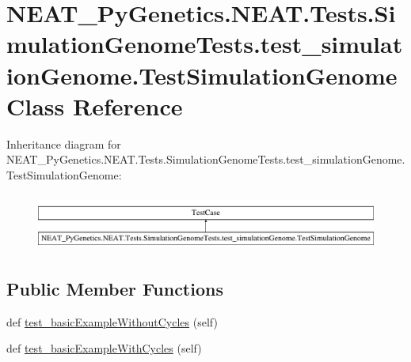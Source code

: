 \hypertarget{classNEAT__PyGenetics_1_1NEAT_1_1Tests_1_1SimulationGenomeTests_1_1test__simulationGenome_1_1TestSimulationGenome}{}\section{N\+E\+A\+T\+\_\+\+Py\+Genetics.\+N\+E\+A\+T.\+Tests.\+Simulation\+Genome\+Tests.\+test\+\_\+simulation\+Genome.\+Test\+Simulation\+Genome Class Reference}
\label{classNEAT__PyGenetics_1_1NEAT_1_1Tests_1_1SimulationGenomeTests_1_1test__simulationGenome_1_1TestSimulationGenome}
Inheritance diagram for N\+E\+A\+T\+\_\+\+Py\+Genetics.\+N\+E\+A\+T.\+Tests.\+Simulation\+Genome\+Tests.\+test\+\_\+simulation\+Genome.\+Test\+Simulation\+Genome\+:\begin{figure}[H]
\begin{center}
\leavevmode
\includegraphics[height=1.895093cm]{classNEAT__PyGenetics_1_1NEAT_1_1Tests_1_1SimulationGenomeTests_1_1test__simulationGenome_1_1TestSimulationGenome}
\end{center}
\end{figure}
\subsection*{Public Member Functions}
\begin{DoxyCompactItemize}
\item 
def \hyperlink{classNEAT__PyGenetics_1_1NEAT_1_1Tests_1_1SimulationGenomeTests_1_1test__simulationGenome_1_1TestSimulationGenome_a184a01fe3c6ad018183362dba9be2fa1}{test\+\_\+basic\+Example\+Without\+Cycles} (self)
\item 
def \hyperlink{classNEAT__PyGenetics_1_1NEAT_1_1Tests_1_1SimulationGenomeTests_1_1test__simulationGenome_1_1TestSimulationGenome_a184b06bada55fc6f36919253969e469b}{test\+\_\+basic\+Example\+With\+Cycles} (self)
\end{DoxyCompactItemize}


